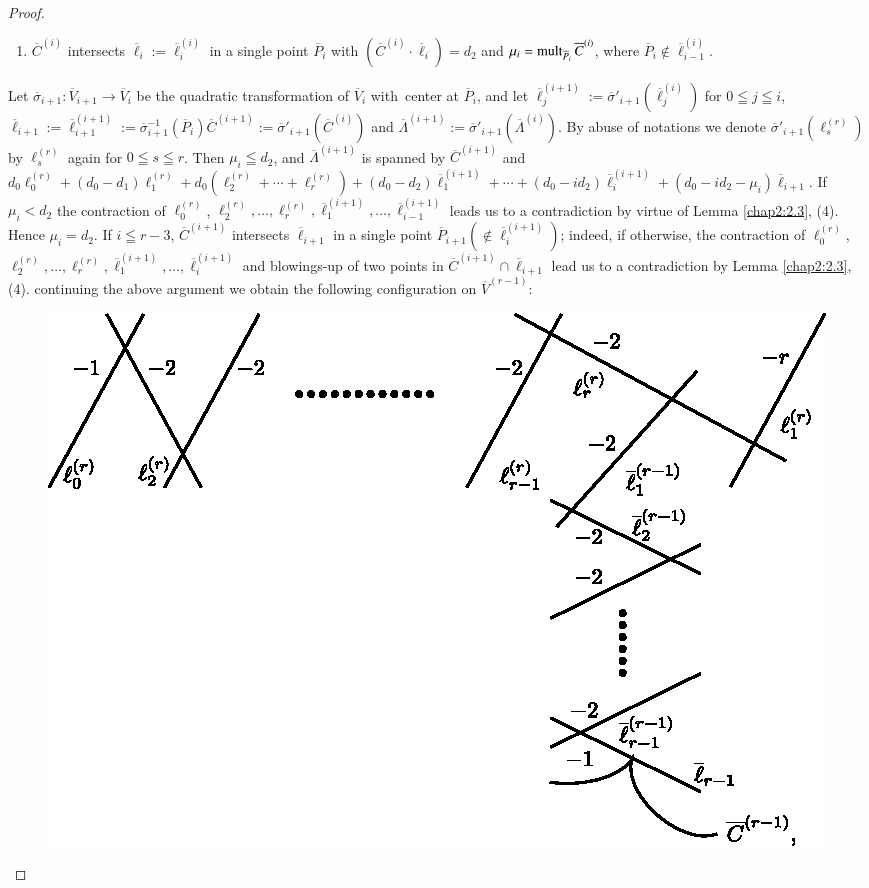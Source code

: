 \begin{proof}
\begin{enumerate}
\begin{enumerate}
\item $\overline{C}^{(i)}$ intersects
  $\overline{\ell}_{i}:=\overline{\ell}^{(i)}_{i}$ in a single point
  $\overline{P}_{i}$ with
  $(\overline{C}^{(i)}\cdot\overline{\ell}_{i})=d_{2}$ and
  $\mu_{i}=\operatorname{mult}_{\overline{P}_{i}}\overline{C}^{(i)}$, where
  $\overline{P}_{i}\not\in\overline{\ell}^{(i)}_{i-1}$. 
\end{enumerate}
Let $\overline{\sigma}_{i+1}:\overline{V}_{i+1}\to \overline{V}_{i}$
be the quadratic transformation of $\overline{V}_{i}$
with\pageoriginale\ center at $\overline{P}_{i}$, and let
$\overline{\ell}_{j}^{(i+1)}:=\overline{\sigma}'_{i+1}(\overline{\ell}^{(i)}_{j})$
for $0\leqq j\leqq i$,
$\overline{\ell}_{i+1}:=\overline{\ell}^{(i+1)}_{i+1}:=\overline{\sigma}^{-1}_{i+1}(\overline{P}_{i})
\overline{C}^{(i+1)}:=\overline{\sigma}'_{i+1}(\overline{C}^{(i)})$
and
$\overline{\Lambda}^{(i+1)}:=\overline{\sigma}'_{i+1}(\overline{\Lambda}^{(i)})$. By
abuse of notations we denote
$\overline{\sigma}'_{i+1}(\ell^{(r)}_{s})$ by $\ell^{(r)}_{s}$ again
for $0\leqq s\leqq r$. Then $\mu_{i}\leqq d_{2}$, and
$\overline{\Lambda}^{(i+1)}$ is spanned by $\overline{C}^{(i+1)}$ and
$d_{0}\ell_{0}^{(r)}+(d_{0}-d_{1})\ell^{(r)}_{1}+d_{0}(\ell^{(r)}_{2}+\cdots+\ell^{(r)}_{r})+(d_{0}-d_{2})\overline{\ell}_{1}^{(i+1)}+\cdots+(d_{0}-id_{2})\overline{\ell}_{i}^{(i+1)}+(d_{0}-id_{2}-\mu_{i})\overline{\ell}_{i+1}$. If
$\mu_{i}<d_{2}$ the contraction of $\ell^{(r)}_{0}$,
$\ell^{(r)}_{2},\ldots,\ell^{(r)}_{r},\overline{\ell}_{1}^{(i+1)},\ldots,\overline{\ell}^{(i+1)}_{i-1}$
leads us to a contradiction by virtue of Lemma \ref{chap2:2.3},
(4). Hence $\mu_{i}=d_{2}$. If $i\leqq r-3$, $\overline{C}^{(i+1)}$
intersects $\overline{\ell}_{i+1}$ in a single point
$\overline{P}_{i+1}(\not\in \overline{\ell}_{i}^{(i+1)})$; indeed, if
otherwise, the contraction of $\ell^{(r)}_{0}$,
$\ell^{(r)}_{2},\ldots,\ell^{(r)}_{r},\overline{\ell}_{1}^{(i+1)},\ldots,\overline{\ell}_{i}^{(i+1)}$
and blowings-up of two points in $\overline{C}^{(i+1)}\cap
\overline{\ell}_{i+1}$ lead us to a contradiction by Lemma
\ref{chap2:2.3}, (4). continuing the above argument we obtain the
following configuration on $\overline{V}^{(r-1)}$:
\begin{figure}[H]
\centering
\includegraphics{figures/chap2-fig23.eps}

\end{figure}
\end{enumerate}
\end{proof}
